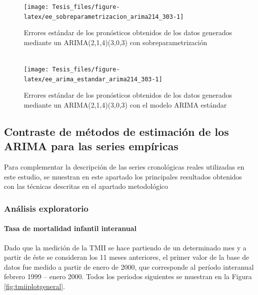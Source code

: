 \documentclass[
]{article}
\begin{document}
\begin{figure}[H]
\texttt{[image: Tesis\_files/figure-latex/ee\_sobreparametrizacion\_arima214\_303-1]} \caption{Errores estándar de los pronósticos obtenidos de los datos generados mediante un ARIMA(2,1,4)(3,0,3) con sobreparametrización \textcolor{white}{prueba de aaaaaaaaaaaaaaaaaaaaaaa}}\label{fig:ee_sobreparametrizacion_arima214_303}
\end{figure}

\begin{figure}[H]
\texttt{[image: Tesis\_files/figure-latex/ee\_arima\_estandar\_arima214\_303-1]} \caption{Errores estándar de los pronósticos obtenidos de los datos generados mediante un ARIMA(2,1,4)(3,0,3) con el modelo ARIMA estándar}\label{fig:ee_arima_estandar_arima214_303}
\end{figure}

\subsection{Contraste de métodos de estimación de los ARIMA para las series empíricas}

Para complementar la descripción de las series cronológicas reales
utilizadas en este estudio, se muestran en este apartado los principales
resultados obtenidos con las técnicas descritas en el apartado
metodológico

\subsubsection{Análisis exploratorio}

\paragraph{Tasa de mortalidad infantil interanual}

Dado que la medición de la TMII se hace partiendo de un determinado mes
y a partir de éste se consideran los 11 meses anteriores, el primer
valor de la base de datos fue medido a partir de enero de 2000, que
corresponde al período interanual febrero 1999 -- enero 2000. Todos los
periodos siguientes se muestran en la Figura \ref{fig:tmiiplotgeneral}.
\end{document}
